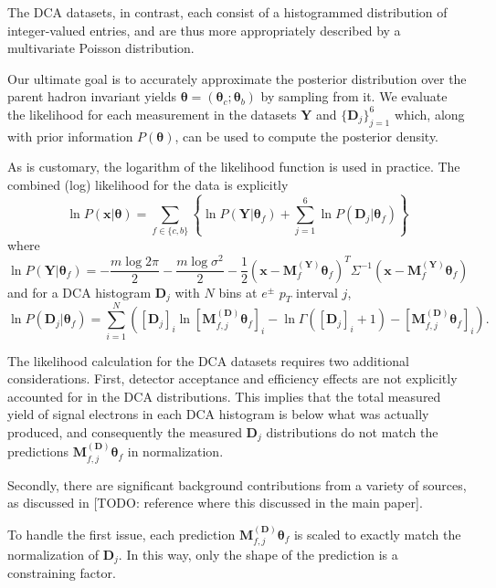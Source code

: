 \documentclass[12pt]{article}
\newcommand{\pt}{p_T}
\newcommand{\xvec}{\mathbf{x}}
\newcommand{\thetavec}{\mathbf{\theta}}
\newcommand{\prior}{P(\thetavec)}
\newcommand{\like}{P(\xvec|\thetavec)}
\newcommand{\eptdata}{\mathbf{Y}}
\newcommand{\dcadata}{\mathbf{D}_j}
\newcommand{\My}{\mathbf{M}_{f}^{\mathbf{(Y)}}}
\newcommand{\Md}{\mathbf{M}_{f,j}^{\mathbf{(D)}}}
\begin{document}
The DCA datasets, in contrast, each consist of a histogrammed distribution of integer-valued entries, and are thus more appropriately described by a multivariate Poisson distribution.

Our ultimate goal is to accurately approximate the posterior distribution over the parent hadron invariant yields $\thetavec = (\thetavec_c; \thetavec_b)$ by sampling from it. We evaluate the likelihood for each measurement in the datasets $\eptdata$ and $\{\dcadata\}_{j=1}^6$ which, along with prior information $\prior$, can be used to compute the posterior density.

As is customary, the logarithm of the likelihood function is used in practice. The combined (log) likelihood for the data is explicitly
\begin{equation} \label{eq:logl}
  \ln \like = \sum_{f \in \{c,b\}} 
  \left\{ \ln P(\eptdata|\thetavec_f) + \sum_{j=1}^6 \ln P(\dcadata|\thetavec_f) \right\}
\end{equation}
where
\begin{equation} \label{eq:llgauss}
  \ln P(\eptdata|\thetavec_f) = -\frac{m \log 2\pi}{2} - \frac{m \log \sigma^2}{2} - \frac{1}{2} (\xvec - \My \thetavec_f)^T \Sigma^{-1} (\xvec - \My \thetavec_f) 
\end{equation}
and for a DCA histogram $\dcadata$ with $N$ bins at $e^{\pm}$ $\pt$ interval $j$,
\begin{equation} \label{eq:llpoiss}
\ln P(\dcadata|\thetavec_f) = 
\sum_{i=1}^{N} \left([\dcadata]_i \ln [\Md \thetavec_f]_i - \ln \Gamma([\dcadata]_i + 1) - [\Md \thetavec_f]_i \right).
\end{equation}

The likelihood calculation for the DCA datasets requires two additional considerations. First, detector acceptance and efficiency effects are not explicitly accounted for in the DCA distributions. This implies that the total measured yield of signal electrons in each DCA histogram is below what was actually produced, and consequently the measured $\dcadata$ distributions do not match the predictions $\Md \thetavec_f$ in normalization.

Secondly, there are significant background contributions from a variety of sources, as discussed in [TODO: reference where this discussed in the main paper].

To handle the first issue, each prediction $\Md \thetavec_f$ is scaled to exactly match the normalization of $\dcadata$. In this way, only the shape of the prediction is a constraining factor.
\end{document}
